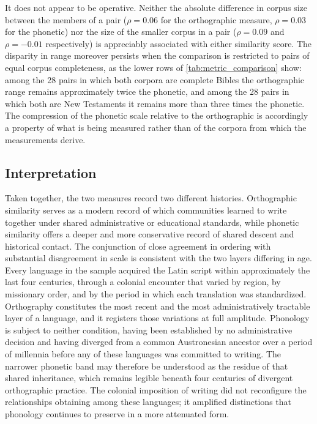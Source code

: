 It does not appear to be operative. Neither the absolute difference in corpus
size between the members of a pair (\( \rho = 0.06 \) for the orthographic
measure, \( \rho = 0.03 \) for the phonetic) nor the size of the smaller corpus
in a pair (\( \rho = 0.09 \) and \( \rho = -0.01 \) respectively) is
appreciably associated with either similarity score. The disparity in range
moreover persists when the comparison is restricted to pairs of equal corpus
completeness, as the lower rows of \cref{tab:metric_comparison} show: among the
28 pairs in which both corpora are complete Bibles the orthographic range
remains approximately twice the phonetic, and among the 28 pairs in which both
are New Testaments it remains more than three times the phonetic. The
compression of the phonetic scale relative to the orthographic is accordingly a
property of what is being measured rather than of the corpora from which the
measurements derive.

\subsection{Interpretation}

Taken together, the two measures record two different histories. Orthographic
similarity serves as a modern record of which communities learned to write
together under shared administrative or educational standards, while phonetic
similarity offers a deeper and more conservative record of shared descent and
historical contact. The conjunction of close agreement in ordering with
substantial disagreement in scale is consistent with the two layers differing
in age. Every language in the sample acquired the Latin script within
approximately the last four centuries, through a colonial encounter that varied
by region, by missionary order, and by the period in which each translation was
standardized. Orthography constitutes the most recent and the most
administratively tractable layer of a language, and it registers those
variations at full amplitude. Phonology is subject to neither condition, having
been established by no administrative decision and having diverged from a
common Austronesian ancestor over a period of millennia before any of these
languages was committed to writing. The narrower phonetic band may therefore be
understood as the residue of that shared inheritance, which remains legible
beneath four centuries of divergent orthographic practice. The colonial
imposition of writing did not reconfigure the relationships obtaining among
these languages; it amplified distinctions that phonology continues to preserve
in a more attenuated form.


